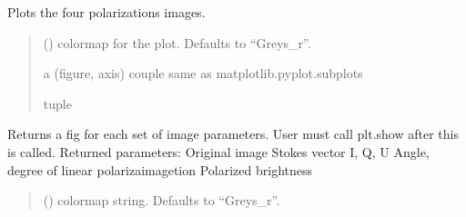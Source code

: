 \documentclass[letterpaper,10pt,english]{sphinxmanual}
\begin{document}
\begin{fulllineitems}
\begin{fulllineitems}
\label{\detokenize{micropolarray:micropolarray.micropol_image.MicropolImage.show_single_pol_images}}
\pysigstartsignatures
{}
\pysigstopsignatures
\sphinxAtStartPar
Plots the four polarizations images.
\begin{quote}\begin{description}
\sphinxAtStartPar
{} (\sphinxstyleliteralemphasis{\sphinxupquote{, }}) \textendash{} colormap for the plot. Defaults to “Greys\_r”.

\sphinxAtStartPar
a (figure, axis) couple same as matplotlib.pyplot.subplots

\sphinxAtStartPar
tuple

\end{description}\end{quote}

\end{fulllineitems}


\begin{fulllineitems}
\label{\detokenize{micropolarray:micropolarray.micropol_image.MicropolImage.show_with_pol_params}}
\pysigstartsignatures
{}
\pysigstopsignatures
\sphinxAtStartPar
Returns a fig for each set of image parameters. User must call
plt.show after this is called.
Returned parameters:
\sphinxhyphen{} Original image
\sphinxhyphen{} Stokes vector I, Q, U
\sphinxhyphen{} Angle, degree of linear polarizaimagetion Polarized brightness
\begin{quote}\begin{description}
\sphinxAtStartPar
{} (\sphinxstyleliteralemphasis{\sphinxupquote{, }}) \textendash{} colormap string. Defaults to “Greys\_r”.


\end{description}
\end{quote}
\end{fulllineitems}
\end{fulllineitems}
\end{document}

